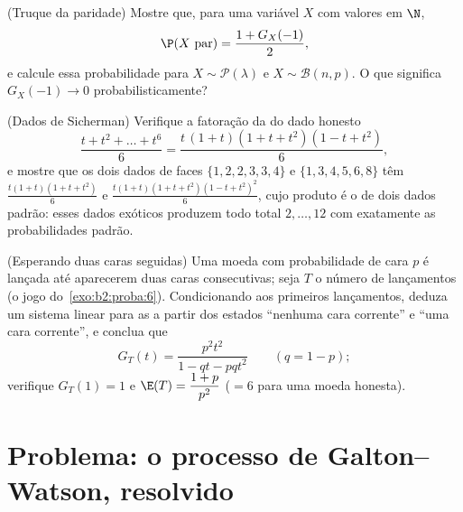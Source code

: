 \begin{exercise}[$\star$]\label{exo:b2:genfun:10}
(Truque da paridade) Mostre que, para uma variável $X$ com valores em $\N$,
\[
\P(X \text{ par}) = \frac{1 + G_X(-1)}{2} ,
\]
e calcule essa probabilidade para $X \sim \mathcal P(\lambda)$
e $X \sim \mathcal B(n, p)$. O que significa $G_X(-1) \to 0$
probabilisticamente?
\end{exercise}

\begin{exercise}[$\star\star$]\label{exo:b2:genfun:11}
(Dados de Sicherman) Verifique a fatoração da 
do dado honesto
\[
\frac{t + t^2 + \dots + t^6}{6}
= \frac{t\,(1 + t)(1 + t + t^2)(1 - t + t^2)}{6},
\]
e mostre que os dois dados de faces $\{1, 2, 2, 3, 3, 4\}$
e $\{1, 3, 4, 5, 6, 8\}$ têm 
$\frac{t(1+t)(1+t+t^2)}6$ e
$\frac{t(1+t)(1+t+t^2)(1-t+t^2)^2}6$, cujo produto é o de
dois dados padrão: esses dados exóticos produzem todo total $2,
\dots, 12$ com exatamente as probabilidades padrão.
\end{exercise}

\begin{exercise}[$\star\star\star$]\label{exo:b2:genfun:12}
(Esperando duas caras seguidas) Uma moeda com probabilidade de cara
$p$ é lançada até aparecerem duas caras consecutivas; seja $T$
o número de lançamentos (o jogo do~\cref{exo:b2:proba:6}).
Condicionando aos primeiros lançamentos, deduza um sistema linear para
as  a partir dos estados ``nenhuma cara corrente''
e ``uma cara corrente'', e conclua que
\[
G_T(t) = \frac{p^2t^2}{1 - qt - pqt^2}
\qquad (q = 1 - p);
\]
verifique $G_T(1) = 1$ e $\E(T) = \dfrac{1 + p}{p^2}$ ($= 6$
para uma moeda honesta).
\end{exercise}

\section{Problema: o processo de Galton--Watson, resolvido}

